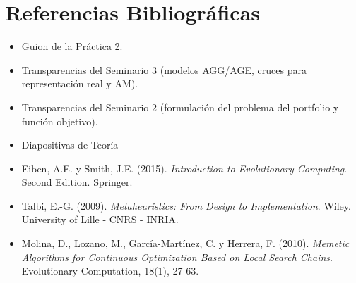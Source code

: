\documentclass[12pt, a4paper]{article}
\begin{document}
\hypersetup{pageanchor=false}

\hypersetup{pageanchor=true}
\newpage

\tableofcontents
\newpage








\newpage
{}

\section*{Referencias Bibliográficas}
\begin{itemize}
    \item Guion de la Práctica 2.
    \item Transparencias del Seminario 3 (modelos AGG/AGE, cruces para representación real y AM).
    \item Transparencias del Seminario 2 (formulación del problema del portfolio y función objetivo).
    \item Diapositivas de Teoría
    \item Eiben, A.E. y Smith, J.E. (2015). \textit{Introduction to Evolutionary Computing}. Second Edition. Springer.
    \item Talbi, E.-G. (2009). \textit{Metaheuristics: From Design to Implementation}. Wiley. University of Lille - CNRS - INRIA.
    \item Molina, D., Lozano, M., García-Martínez, C. y Herrera, F. (2010). \textit{Memetic Algorithms for Continuous Optimization Based on Local Search Chains}. Evolutionary Computation, 18(1), 27-63.
\end{itemize}
\end{document}
